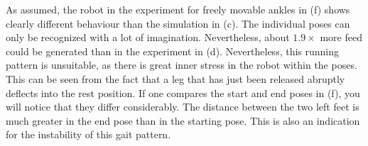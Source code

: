 \documentclass[letterpaper,10pt,conference]{ieeeconf}  %
\begin{document}
%
As assumed, the robot in the experiment for freely movable ankles in (f) shows clearly different behaviour than the simulation in (c).
The individual poses can only be recognized with a lot of imagination.
Nevertheless, about $1.9 \times$ more feed could be generated than in the experiment in (d).
Nevertheless, this running pattern is unsuitable, as there is great inner stress in the robot within the poses.
This can be seen from the fact that a leg that has just been released abruptly deflects into the rest position.
If one compares the start and end poses in (f), you will notice that they differ considerably.
The distance between the two left feet is much greater in the end pose than in the starting pose.
This is also an indication for the instability of this gait pattern.
\end{document}
